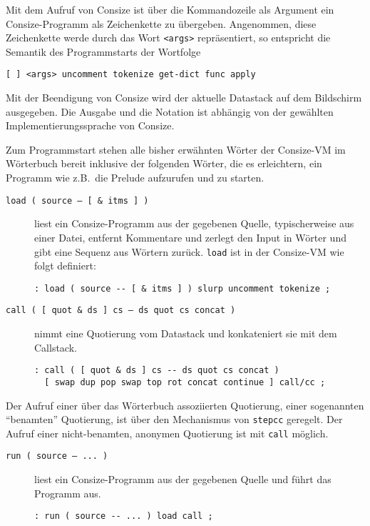 Mit dem Aufruf von Consize ist über die Kommandozeile als Argument ein Consize-Programm als Zeichenkette zu übergeben. Angenommen, diese Zeichenkette werde durch das Wort \verb|<args>| repräsentiert, so entspricht die Semantik des Programmstarts der Wortfolge

\begin{verbatim}
[ ] <args> uncomment tokenize get-dict func apply
\end{verbatim}

Mit der Beendigung von Consize wird der aktuelle Datastack auf dem Bildschirm ausgegeben. Die Ausgabe und die Notation ist ab\-häng\-ig von der gewählten Implementierungssprache von Consize.

Zum Programmstart stehen alle bisher erwähnten Wörter der Consize-VM im Wörterbuch bereit inklusive der folgenden Wörter, die es erleichtern, ein Programm wie z.B.\ die Prelude aufzurufen und zu starten.

\begin{description}
\item[\texttt{load ( source -- [ \& itms ] )}] liest ein Consize-Programm aus der gegebenen Quelle, typischerweise aus einer Datei, entfernt Kommentare und zerlegt den Input in Wörter und gibt eine Sequenz aus Wörtern zurück. \verb|load| ist in der Consize-VM wie folgt definiert:
\begin{verbatim}
: load ( source -- [ & itms ] ) slurp uncomment tokenize ;
\end{verbatim}
\end{description}

\begin{description}
\item[\texttt{call ( [ quot \& ds ] cs -- ds quot cs concat )}] nimmt eine Quotierung vom Datastack und konkateniert sie mit dem Callstack. 
\begin{verbatim}
: call ( [ quot & ds ] cs -- ds quot cs concat )
  [ swap dup pop swap top rot concat continue ] call/cc ;
\end{verbatim}
\end{description}

Der Aufruf einer über das Wörterbuch assoziierten Quotierung, einer sogenannten "`benamten"' Quotierung, ist über den Mechanismus von \verb|stepcc| geregelt. Der Aufruf einer nicht-benamten, anonymen Quotierung ist mit \verb|call| möglich.

\begin{description}
\item[\texttt{run ( source -- ... )}] liest ein Consize-Programm aus der gegebenen Quelle und führt das Programm aus.
\begin{verbatim}
: run ( source -- ... ) load call ;
\end{verbatim}
\end{description}

